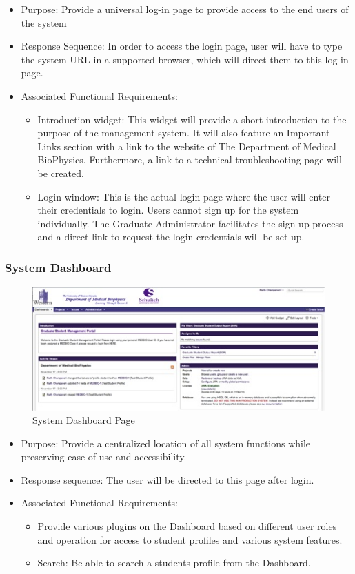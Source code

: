 \documentclass{journal}
\begin{document}
\begin{itemize}
\item Purpose: Provide a universal log-in page to provide access to the end users of the system
\item Response Sequence: In order to access the login page, user will have to type the system URL in a supported browser, which will direct them to this log in page. 
\item Associated Functional Requirements: 
\begin {itemize} 
\item Introduction widget: This widget will provide a short introduction to the purpose of the management system. It will also feature an Important Links section with a link to the website of The Department of Medical BioPhysics. Furthermore, a link to a technical troubleshooting page will be created.
\item Login window: This is the actual login page where the user will enter their credentials to login. Users cannot sign up for the system individually. The Graduate Administrator facilitates the sign up process and a direct link to request the login credentials will be set up.
\end{itemize}
\end{itemize}


\subsubsection{System Dashboard}
\begin{figure}[htp]
\centering
\includegraphics[scale=1]{diagrams/HTMLTemplating/Figure2.jpg}
\caption{System Dashboard Page}
\label{fig:SystemDashBoard}
\end{figure}

\begin{itemize}
\item Purpose: Provide a centralized location of all system functions while preserving ease of use and accessibility.
\item Response sequence: The user will be directed to this page after login.
\item Associated Functional Requirements:
\begin{itemize}
\item Provide various plugins on the Dashboard based on different user roles and operation for access to student profiles and various system features. 
\item Search: Be able to search a students profile from the Dashboard.
\end{itemize}
\end{itemize}
\end{document}
